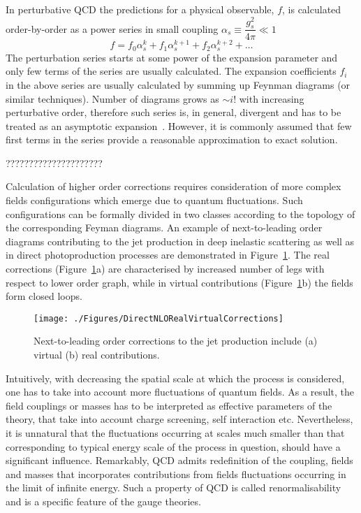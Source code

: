 In perturbative QCD the predictions for a physical observable, $f$, is calculated order-by-order as a power series in small coupling $\alpha_s \equiv \dfrac{g_s^2}{4\pi} \ll 1$
\begin{equation}
   f=f_{0}\alpha^{k}_s + f_{1}\alpha^{k+1}_s + f_{2}\alpha^{k+2}_s + \ldots
	 \label{eq:pertseries}
\end{equation}
The perturbation series starts at some power of the expansion parameter and only few terms of the series are usually calculated. The expansion coefficients $f_i$ in the above series are usually calculated by summing up Feynman diagrams (or similar techniques). Number of diagrams grows as $\sim i!$ with increasing perturbative order, therefore such series is, in general, divergent and has to be treated as an asymptotic expansion~\cite{lipatovQCD}. However, it is commonly assumed that few first terms in the series provide a reasonable approximation to exact solution. 

?????????????????????

Calculation of higher order corrections requires consideration of more complex fields configurations which emerge due to quantum fluctuations. Such configurations can be formally divided in two classes according to the topology of the corresponding Feyman diagrams. An example of next-to-leading order diagrams contributing to the jet production in deep inelastic scattering as well as in direct photoproduction processes are demonstrated in Figure~\ref{fig:nlojetfeyn}. The real corrections (Figure~\ref{fig:nlojetfeyn}a) are characterised by increased number of legs with respect to lower order graph, while in virtual contributions (Figure~\ref{fig:nlojetfeyn}b) the fields form closed loops.
 
\begin{figure}[h]
 \texttt{[image: ./Figures/DirectNLORealVirtualCorrections]}
\caption{Next-to-leading order corrections to the jet production include (a) virtual (b) real contributions.}
\label{fig:nlojetfeyn}
\end{figure}

Intuitively, with decreasing the spatial scale at which the process is considered, one has to take into account more fluctuations of quantum fields. As a result, the field couplings or masses has to be interpreted as effective parameters of the theory, that take into account charge screening, self interaction etc. Nevertheless, it is unnatural that the fluctuations occurring at scales much smaller than that corresponding to typical energy scale of the process in question, should have a significant influence. Remarkably, QCD admits redefinition of the coupling, fields and masses that incorporates contributions from fields fluctuations occurring in the limit of infinite energy. Such a property of QCD is called renormalisability and is a specific feature of the gauge theories. 

